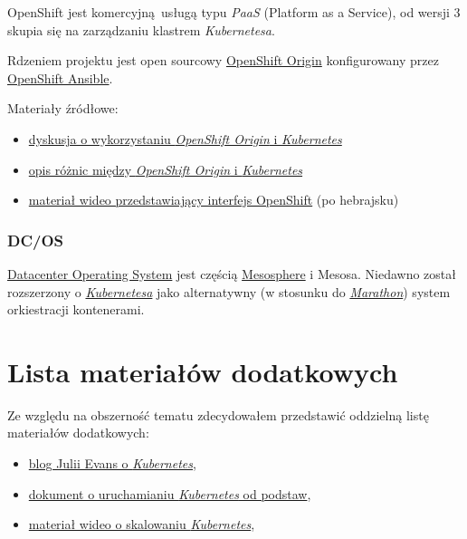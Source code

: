 \documentclass[a4paper,12pt,twoside,openany]{report}
\providecommand{\tightlist}{%
  \setlength{\itemsep}{0pt}\setlength{\parskip}{0pt}}
\begin{document}
OpenShift jest komercyjną~usługą typu \emph{PaaS} (Platform as a
Service), od wersji 3 skupia się na zarządzaniu klastrem
\emph{Kubernetesa}.

Rdzeniem projektu jest open sourcowy
\href{https://github.com/openshift/origin}{OpenShift Origin}
konfigurowany przez \protect\hyperlink{openshift-ansible}{OpenShift
Ansible}.

Materiały źródłowe:

\begin{itemize}
\tightlist
\item
  \href{https://www.reddit.com/r/devops/comments/59ql4r/openshift_origin_vs_kubernetes/}{dyskusja
  o wykorzystaniu \emph{OpenShift Origin} i \emph{Kubernetes}}
\item
  \href{https://medium.com/levvel-consulting/the-differences-between-kubernetes-and-openshift-ae778059a90e}{opis
  różnic między \emph{OpenShift Origin} i \emph{Kubernetes}}
\item
  \href{https://youtu.be/-mFovK19aB4?t=6m54s}{materiał wideo
  przedstawiający interfejs OpenShift} (po hebrajsku)
\end{itemize}

\hypertarget{dcos}{%
\subsubsection{DC/OS}\label{dcos}}

\href{https://dcos.io/}{Datacenter Operating System} jest częścią
\href{https://mesosphere.com/}{Mesosphere} i Mesosa. Niedawno został
rozszerzony o
\href{https://mesosphere.com/blog/kubernetes-dcos/}{\emph{Kubernetesa}}
jako alternatywny (w stosunku do
\href{https://mesosphere.github.io/marathon/}{\emph{Marathon}}) system
orkiestracji kontenerami.

\hypertarget{lista-materiaux142uxf3w-dodatkowych}{%
\section{Lista materiałów
dodatkowych}\label{lista-materiaux142uxf3w-dodatkowych}}

Ze względu na obszerność tematu zdecydowałem przedstawić oddzielną listę
materiałów dodatkowych:

\begin{itemize}
\tightlist
\item
  \href{https://jvns.ca/categories/kubernetes/}{blog Julii Evans o
  \emph{Kubernetes}},
\item
  \href{https://github.com/kelseyhightower/kubernetes-the-hard-way}{dokument
  o uruchamianiu \emph{Kubernetes} od podstaw},
\item
  \href{https://www.youtube.com/watch?v=4-pawkiazEg}{materiał wideo o
  skalowaniu \emph{Kubernetes}},
\end{itemize}
\end{document}

